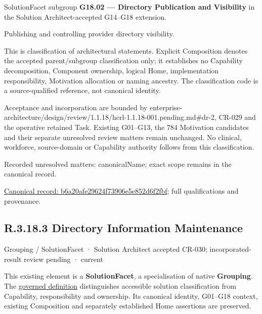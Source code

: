 SolutionFacet subgroup \textbf{G18.02 — Directory Publication and Visibility} in the Solution Architect-accepted G14–G18 extension.



Publishing and controlling provider directory visibility.



This is classification of architectural statements. Explicit Composition denotes the accepted parent/subgroup classification only; it establishes no Capability decomposition, Component ownership, logical Home, implementation responsibility, Motivation allocation or naming ancestry. The classification code is a source-qualified reference, not canonical identity.



Acceptance and incorporation are bounded by enterprise-architecture/design/review/1.1.18/hcrl-1.1.18-001.pending.md\#dr-2, CR-029 and the operative retained Task. Existing G01–G13, the 784 Motivation candidates and their separate unresolved review matters remain unchanged. No clinical, workforce, source-domain or Capability authority follows from this classification.


{\small Recorded unresolved matters: canonicalName; exact scope remains in the canonical record.}\par
{\footnotesize \href{../../../../../../../continuum/grouping/b6a20afe29624f73906e5e852d6f2fbf.md}{Canonical record: b6a20afe29624f73906e5e852d6f2fbf}; full qualifications and provenance.}\par
\subsection*{R.3.18.3 Directory Information Maintenance}
\label{navigation:R.3.18.3}

\label{element:d2876dff4f5444e3b71bdeba487b2d6b}
{\small Grouping / SolutionFacet · Solution Architect accepted CR-030; incorporated-result review pending · current}\par

This existing element is a \textbf{SolutionFacet}, a specialisation of native
\textbf{Grouping}. The \href{\detokenize{../../../../../../../governance/continuum-representation.md#solutionfacet-classification--1119-candidate}}{governed definition}
distinguishes accessible solution classification from Capability, responsibility
and ownership. Its canonical identity, G01–G18 context, existing Composition
and separately established Home assertions are preserved.



